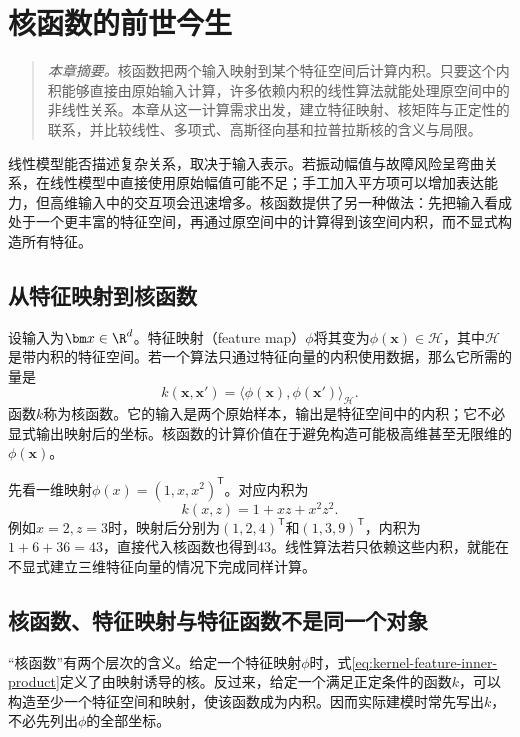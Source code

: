 \chapter{核函数的前世今生}
\label{chap:kernel-functions}
\begin{quote}\small
\textit{本章摘要。}核函数把两个输入映射到某个特征空间后计算内积。只要这个内积能够直接由原始输入计算，许多依赖内积的线性算法就能处理原空间中的非线性关系。本章从这一计算需求出发，建立特征映射、核矩阵与正定性的联系，并比较线性、多项式、高斯径向基和拉普拉斯核的含义与局限。
\end{quote}

线性模型能否描述复杂关系，取决于输入表示。若振动幅值与故障风险呈弯曲关系，在线性模型中直接使用原始幅值可能不足；手工加入平方项可以增加表达能力，但高维输入中的交互项会迅速增多。核函数提供了另一种做法：先把输入看成处于一个更丰富的特征空间，再通过原空间中的计算得到该空间内积，而不显式构造所有特征。

\section{从特征映射到核函数}
设输入为$\bm x\in\R^d$。特征映射（feature map）$\phi$将其变为$\phi(\bm x)\in\mathcal H$，其中$\mathcal H$是带内积的特征空间。若一个算法只通过特征向量的内积使用数据，那么它所需的量是
\begin{equation}
 k(\bm x,\bm x')=\langle\phi(\bm x),\phi(\bm x')\rangle_{\mathcal H}.
 \label{eq:kernel-feature-inner-product}
\end{equation}
函数$k$称为核函数。它的输入是两个原始样本，输出是特征空间中的内积；它不必显式输出映射后的坐标。核函数的计算价值在于避免构造可能极高维甚至无限维的$\phi(\bm x)$。

先看一维映射$\phi(x)=(1,x,x^2)^{\mathsf T}$。对应内积为
\begin{equation}
 k(x,z)=1+xz+x^2z^2.
\end{equation}
例如$x=2,z=3$时，映射后分别为$(1,2,4)^{\mathsf T}$和$(1,3,9)^{\mathsf T}$，内积为$1+6+36=43$，直接代入核函数也得到$43$。线性算法若只依赖这些内积，就能在不显式建立三维特征向量的情况下完成同样计算。

\section{核函数、特征映射与特征函数不是同一个对象}
“核函数”有两个层次的含义。给定一个特征映射$\phi$时，式\eqref{eq:kernel-feature-inner-product}定义了由映射诱导的核。反过来，给定一个满足正定条件的函数$k$，可以构造至少一个特征空间和映射，使该函数成为内积。因而实际建模时常先写出$k$，不必先列出$\phi$的全部坐标。

